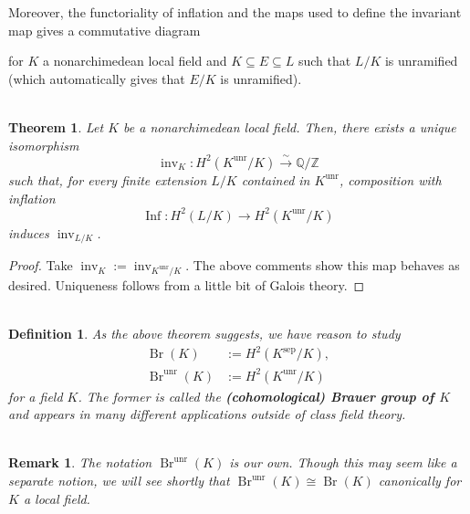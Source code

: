 \documentclass[11pt]{article}
\newcommand{\Q}{\mathbb{Q}}
\newcommand{\Z}{\mathbb{Z}}
\newcommand{\iso}{\cong}
\newcommand{\xto}[1]{\xrightarrow{#1}}
\DeclareMathOperator{\Br}{Br} %
\DeclareMathOperator{\Inf}{Inf} %
\DeclareMathOperator{\inv}{inv} %
\DeclareMathOperator{\sep}{sep} %
\DeclareMathOperator{\unr}{unr} %
\renewcommand{\subset}{\subseteq}
\newtheorem*{definition*}{\\Definition}
\newtheorem*{remark*}{\\Remark}
\newtheorem*{theorem*}{\\Theorem}
\begin{document}
Moreover, the functoriality of inflation and the maps used to define the invariant map gives a commutative diagram 
\begin{center}
\end{center}
for $K$ a nonarchimedean local field and $K\subset E\subset L$ such that $L/K$ is unramified (which automatically gives that $E/K$ is unramified).

\begin{theorem*}
Let $K$ be a nonarchimedean local field. Then, there exists a unique isomorphism 
$$\inv_K: H^2(K^{\unr}/K)\xto{\sim}\Q/\Z$$
such that, for every finite extension $L/K$ contained in $K^{\unr}$, composition with inflation 
$$\Inf: H^2(L/K)\to H^2(K^{\unr}/K)$$ 
induces $\inv_{L/K}$.
\end{theorem*}
\begin{proof}
Take $\inv_K:=\inv_{K^{\unr}/K}$. The above comments show this map behaves as desired. Uniqueness follows from a little bit of Galois theory.
\end{proof}

\begin{definition*}
As the above theorem suggests, we have reason to study 
\begin{align*}
\Br(K)&:=H^2(K^{\sep}/K), \\
\Br^{\unr}(K)&:=H^2(K^{\unr}/K)
\end{align*}
for a field $K$. The former is called the \textbf{(cohomological) Brauer group of $K$} and appears in many different applications outside of class field theory.
\end{definition*}

\begin{remark*}
The notation $\Br^{\unr}(K)$ is our own. Though this may seem like a separate notion, we will see shortly that $\Br^{\unr}(K)\iso\Br(K)$ canonically for $K$ a local field.
\end{remark*}
\end{document}
